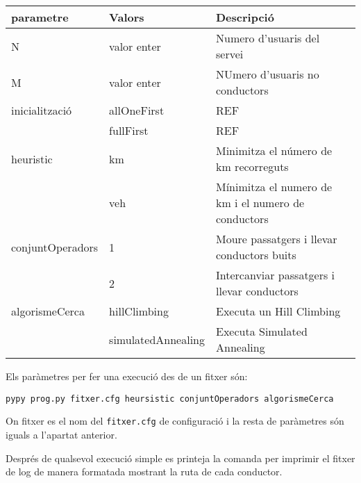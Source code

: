\small
\begin{center}
\begin{tabularx}{\textwidth}{l|lX}
\textbf{parametre}  & \textbf{Valors} & \textbf{Descripció}\\
\midrule
N  & valor enter & Numero d'usuaris del servei\\
M  & valor enter & NUmero d'usuaris no conductors\\
\midrule
inicialització & allOneFirst & REF\\
               & fullFirst   & REF\\
\midrule
heuristic      & km  & Minimitza el número de km recorreguts\\
	       & veh & Mínimitza el numero de km i el numero de conductors\\
\midrule
conjuntOperadors      & 1 & Moure passatgers i llevar conductors buits\\
		      & 2 & Intercanviar passatgers i llevar conductors\\
\midrule
algorismeCerca & hillClimbing & Executa un Hill Climbing\\
               & simulatedAnnealing & Executa Simulated Annealing
\end{tabularx}
\end{center}
\normalsize


Els paràmetres per fer una execució des de un fitxer són:

\begin{verbatim}
pypy prog.py fitxer.cfg heursistic conjuntOperadors algorismeCerca
\end{verbatim}

On fitxer es el nom del \texttt{fitxer.cfg} de configuració i la resta de paràmetres són
iguals a l'apartat anterior.


Després de qualsevol execució simple es printeja la comanda per imprimir el fitxer de log
de manera formatada mostrant la ruta de cada conductor.

